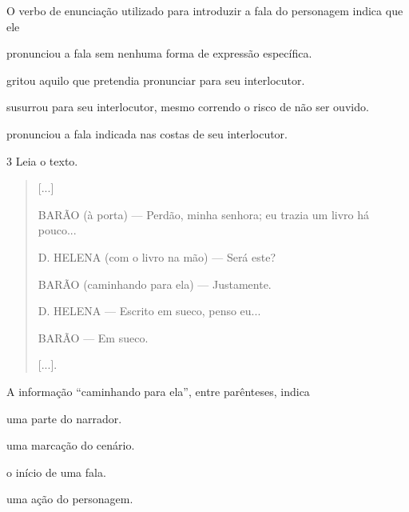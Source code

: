 O verbo de enunciação utilizado para introduzir a fala do personagem indica que ele

\begin{escolha}
\item pronunciou a fala sem nenhuma forma de expressão específica.

\item gritou aquilo que pretendia pronunciar para seu interlocutor.

\item susurrou para seu interlocutor, mesmo correndo o risco de não ser ouvido.

\item pronunciou a fala indicada nas costas de seu interlocutor.
\end{escolha}


\num{3} Leia o texto.

\begin{quote}
{[}...{]}

BARÃO (à porta) — Perdão, minha senhora; eu trazia um livro há
pouco...

D. HELENA (com o livro na mão) — Será este?

BARÃO (caminhando para ela) — Justamente.

D. HELENA — Escrito em sueco, penso eu...

BARÃO — Em sueco.

{[}...{]}.
\end{quote}


A informação “caminhando para ela”, entre parênteses, indica

\begin{minipage}{.5\textwidth}
\begin{escolha}
\item uma parte do narrador.

\item uma marcação do cenário.

\item o início de uma fala.

\item uma ação do personagem.
\end{escolha}
\end{minipage}


